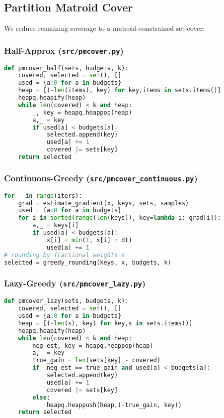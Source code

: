 \documentclass[12pt]{article}
\begin{document}
\subsection*{Partition Matroid Cover}
We reduce remaining coverage to a matroid-constrained set-cover:

\subsubsection*{Half-Approx (\texttt{src/pmcover.py})}
\begin{lstlisting}[language=Python,caption={Greedy \(1/2\)-approximation}]
def pmcover_half(sets, budgets, k):
    covered, selected = set(), []
    used = {a:0 for a in budgets}
    heap = [(-len(items), key) for key,items in sets.items()]
    heapq.heapify(heap)
    while len(covered) < k and heap:
        _, key = heapq.heappop(heap)
        a,_ = key
        if used[a] < budgets[a]:
            selected.append(key)
            used[a] += 1
            covered |= sets[key]
    return selected
\end{lstlisting}

\subsubsection*{Continuous-Greedy (\texttt{src/pmcover\_continuous.py})}
\begin{lstlisting}[language=Python,caption={Continuous-greedy gradient ascent}]
for _ in range(iters):
    grad = estimate_gradient(x, keys, sets, samples)
    used = {a:0 for a in budgets}
    for i in sorted(range(len(keys)), key=lambda i:-grad[i]):
        a,_ = keys[i]
        if used[a] < budgets[a]:
            x[i] = min(1, x[i] + dt)
            used[a] += 1
# rounding by fractional weights x
selected = greedy_rounding(keys, x, budgets, k)
\end{lstlisting}

\subsubsection*{Lazy-Greedy (\texttt{src/pmcover\_lazy.py})}
\begin{lstlisting}[language=Python,caption={Lazy update to avoid re-scans}]
def pmcover_lazy(sets, budgets, k):
    covered, selected = set(), []
    used = {a:0 for a in budgets}
    heap = [(-len(s), key) for key,s in sets.items()]
    heapq.heapify(heap)
    while len(covered) < k and heap:
        neg_est, key = heapq.heappop(heap)
        a,_ = key
        true_gain = len(sets[key] - covered)
        if -neg_est == true_gain and used[a] < budgets[a]:
            selected.append(key)
            used[a] += 1
            covered |= sets[key]
        else:
            heapq.heappush(heap,(-true_gain, key))
    return selected
\end{lstlisting}
\end{document}
